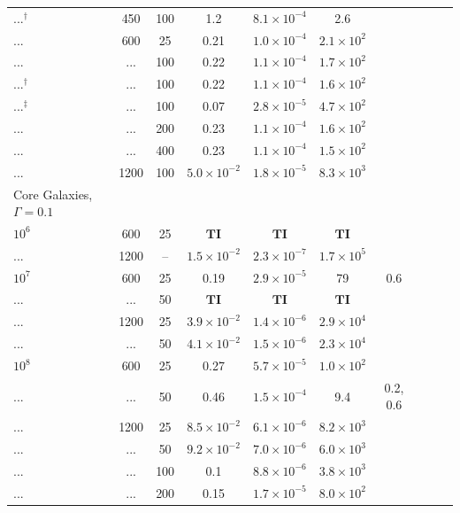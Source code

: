 \documentclass[usenatbib,fleqn]{mn2e}
\begin{document}
\begin{table}
\begin{threeparttable}
\begin{minipage}{18cm}
\begin{tabular}{lccccccccc}
...$^{\dagger}$ & 450 & 100 & 1.2 & $ 8.1 \times 10^{ -4 }$ & 2.6 \\
... & 600 & 25 & 0.21 & $ 1.0 \times 10^{ -4 }$ & $ 2.1 \times 10^{ 2 }$ \\
... & ... & 100 & 0.22 & $ 1.1 \times 10^{ -4 }$ & $ 1.7 \times 10^{ 2
}$ \\
...$^{\dagger}$ & ... & 100 & 0.22 & $ 1.1 \times 10^{ -4 }$ & $ 1.6 \times 10^{ 2 }$ \\
...$^{\ddagger}$  & ... & 100 & 0.07 & $ 2.8 \times 10^{ -5 }$ & $ 4.7 \times 10^{ 2
}$ \\
... & ... & 200 & 0.23 & $ 1.1 \times 10^{ -4 }$ & $ 1.6 \times 10^{ 2 }$ \\
... & ... & 400 & 0.23 & $ 1.1 \times 10^{ -4 }$ & $ 1.5 \times 10^{ 2 }$ \\
... & 1200 & 100 & $ 5.0 \times 10^{ -2 }$ & $ 1.8 \times 10^{ -5 }$ & $ 8.3 \times 10^{ 3 }$ \\
\hline
Core Galaxies, $\Gamma = 0.1$  &  & & & & & & & & \\
$    10^{ 6 }$ & 600 & 25 & $\mathbf{TI}$ & $\mathbf{TI}$ & $\mathbf{TI}$  & \\
... & 1200 & -- & $ 1.5 \times 10^{ -2 }$ & $ 2.3 \times 10^{ -7 }$ & $ 1.7 \times 10^{ 5 }$ \\
$    10^{ 7 }$ & 600 & 25 & 0.19 & $ 2.9 \times 10^{ -5 }$ & 79 & 0.6 \\
... & ... & 50 & $\mathbf{TI}$ & $\mathbf{TI}$ & $\mathbf{TI}$ \\
... & 1200 & 25 & $ 3.9 \times 10^{ -2 }$ & $ 1.4 \times 10^{ -6 }$ & $ 2.9 \times 10^{ 4 }$ \\
... & ... & 50 & $ 4.1 \times 10^{ -2 }$ & $ 1.5 \times 10^{ -6 }$ & $ 2.3 \times 10^{ 4 }$ \\
$    10^{ 8 }$ & 600 & 25 & 0.27 & $ 5.7 \times 10^{ -5 }$ &
$ 1.0 \times 10^{ 2 }$ \\
... & ... & 50 & 0.46 & $ 1.5 \times 10^{ -4 }$ & 9.4 & 0.2, 0.6\\
... & 1200 & 25 & $ 8.5 \times 10^{ -2 }$ & $ 6.1 \times 10^{ -6 }$ & $ 8.2 \times 10^{ 3 }$ \\
... & ... & 50 & $ 9.2 \times 10^{ -2 }$ & $ 7.0 \times 10^{ -6 }$ & $ 6.0 \times 10^{ 3 }$ \\
... & ... & 100 & 0.1 & $ 8.8 \times 10^{ -6 }$ & $ 3.8 \times 10^{ 3 }$ \\
... & ... & 200 & 0.15 & $ 1.7 \times 10^{ -5 }$ & $ 8.0 \times 10^{ 2 }$ \\

\end{tabular}
\end{minipage}
\end{threeparttable}
\end{table}
\end{document}
